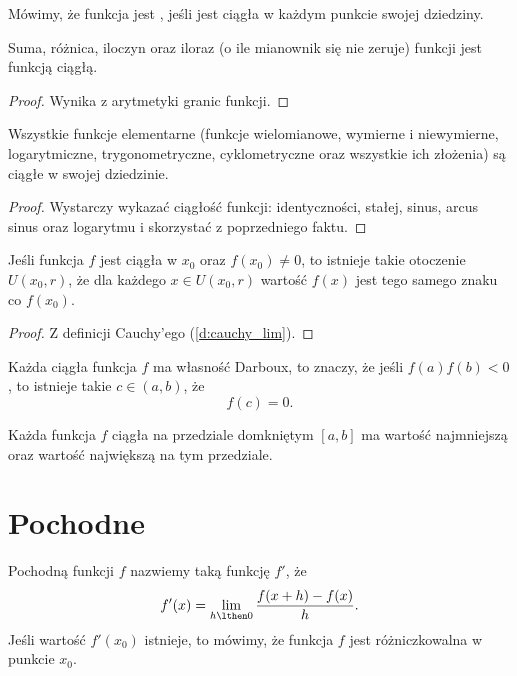 \documentclass[11pt]{scrartcl}
\begin{document}
    Mówimy, że funkcja jest , jeśli jest ciągła w każdym punkcie swojej dziedziny.

    \begin{fact}
        Suma, różnica, iloczyn oraz iloraz (o ile mianownik się nie zeruje) funkcji jest funkcją ciągłą.
    \end{fact}
    \begin{proof}
        Wynika z arytmetyki granic funkcji.
    \end{proof}

    \begin{fact}
        Wszystkie funkcje elementarne (funkcje wielomianowe, wymierne i niewymierne, logarytmiczne, trygonometryczne, cyklometryczne oraz wszystkie ich złożenia) są ciągłe w swojej dziedzinie.
    \end{fact}
    \begin{proof}
        Wystarczy wykazać ciągłość funkcji: identyczności, stałej, sinus, arcus sinus oraz logarytmu i skorzystać z poprzedniego faktu.
    \end{proof}

    \begin{theorem}
        Jeśli funkcja $f$ jest ciągła w $x_0$ oraz $f(x_0) \neq 0$, to istnieje takie otoczenie $U(x_0, r)$, że dla każdego $x \in U(x_0, r)$ wartość $f(x)$ jest tego samego znaku co $f(x_0)$.
    \end{theorem}
    \begin{proof}
        Z definicji Cauchy'ego (\ref{d:cauchy_lim}).
    \end{proof}

    \begin{theorem}
        Każda ciągła funkcja $f$ ma własność Darboux, to znaczy, że jeśli $f(a)f(b) < 0$, to istnieje takie $c \in (a, b)$, że
        \[ f(c) = 0. \]
    \end{theorem}

    \begin{theorem}
        Każda funkcja $f$ ciągła na przedziale domkniętym $[a, b]$ ma wartość najmniejszą oraz wartość największą na tym przedziale.
    \end{theorem}

    \section{Pochodne}
    \begin{definition}
        Pochodną funkcji $f$ nazwiemy taką funkcję $f'$, że
        \[ f'(x) = \lim_{h\lthen 0}\frac{f(x + h) - f(x)}{h}. \]
        Jeśli wartość $f'(x_0)$ istnieje, to mówimy, że funkcja $f$ jest różniczkowalna w punkcie $x_0$.
    \end{definition}
\end{document}
